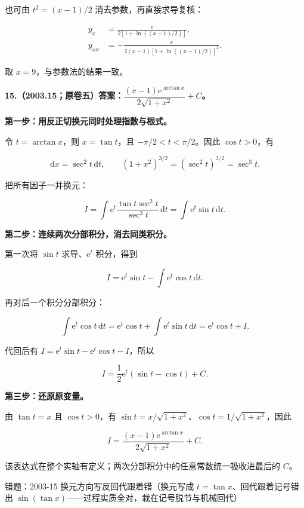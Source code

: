\documentclass[UTF8,11pt,fontset=windows]{ctexart}
\begin{document}
也可由 $t^2=(x-1)/2$ 消去参数，再直接求导复核：

$$
\begin{aligned}
y_x&=\frac{\mathrm e}{2[1+\ln((x-1)/2)]},\\
y_{xx}&=-\frac{\mathrm e}{2(x-1)[1+\ln((x-1)/2)]^2}.
\end{aligned}
$$

取 $x=9$，与参数法的结果一致。

\clearpage

\textbf{15.（2003.15；原卷五）答案：$\dfrac{(x-1)\mathrm e^{\arctan x}}{2\sqrt{1+x^2}}+C$。}

\textbf{第一步：用反正切换元同时处理指数与根式。}

令 $t=\arctan x$，则 $x=\tan t$，且 $-\pi/2<t<\pi/2$。因此 $\cos t>0$，有

$$
\mathrm dx=\sec^2t\,\mathrm dt,
\qquad (1+x^2)^{3/2}=(\sec^2t)^{3/2}=\sec^3t.
$$

把所有因子一并换元：

$$
I=\int\mathrm e^t\frac{\tan t\sec^2t}{\sec^3t}\,\mathrm dt
=\int\mathrm e^t\sin t\,\mathrm dt.
$$

\textbf{第二步：连续两次分部积分，消去同类积分。}

第一次将 $\sin t$ 求导、$\mathrm e^t$ 积分，得到

$$
I=\mathrm e^t\sin t-\int\mathrm e^t\cos t\,\mathrm dt.
$$

再对后一个积分分部积分：

$$
\int\mathrm e^t\cos t\,\mathrm dt
=\mathrm e^t\cos t+\int\mathrm e^t\sin t\,\mathrm dt
=\mathrm e^t\cos t+I.
$$

代回后有 $I=\mathrm e^t\sin t-\mathrm e^t\cos t-I$，所以

$$
I=\frac12\mathrm e^t(\sin t-\cos t)+C.
$$

\textbf{第三步：还原原变量。}

由 $\tan t=x$ 且 $\cos t>0$，有 $\sin t=x/\sqrt{1+x^2}$、$\cos t=1/\sqrt{1+x^2}$，因此

$$
\boxed{I=\frac{(x-1)\mathrm e^{\arctan x}}{2\sqrt{1+x^2}}+C.}
$$

该表达式在整个实轴有定义；两次分部积分中的任意常数统一吸收进最后的 $C$。

\begingroup\color{gray}错题：2003-15 换元方向写反回代跟着错（换元写成 $t=\tan x$、回代跟着记号错出 $\sin(\tan x)$——过程实质全对，栽在记号脱节与机械回代）\par\endgroup
\end{document}
